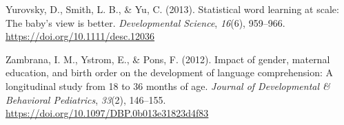 \documentclass[
  english,
  man,floatsintext]{apa6}
\begin{document}
\leavevmode\hypertarget{ref-yurovsky_statistical_2013}{}%
Yurovsky, D., Smith, L. B., \& Yu, C. (2013). Statistical word learning at scale: The baby's view is better. \emph{Developmental Science}, \emph{16}(6), 959--966. \url{https://doi.org/10.1111/desc.12036}

\leavevmode\hypertarget{ref-zambrana_impact_2012}{}%
Zambrana, I. M., Ystrom, E., \& Pons, F. (2012). Impact of gender, maternal education, and birth order on the development of language comprehension: A longitudinal study from 18 to 36 months of age. \emph{Journal of Developmental \& Behavioral Pediatrics}, \emph{33}(2), 146--155. \url{https://doi.org/10.1097/DBP.0b013e31823d4f83}

\endgroup
\end{document}
